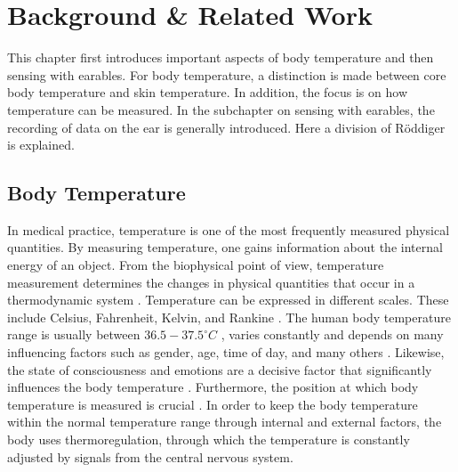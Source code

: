 \chapter{Background \& Related Work}
\label{ch:Background}
This chapter first introduces important aspects of body temperature and then sensing with earables.
For body temperature, a distinction is made between core body temperature and skin temperature. 
In addition, the focus is on how temperature can be measured. 
In the subchapter on sensing with earables, the recording of data on the ear is generally introduced. 
Here a division of Röddiger \cite{roddigerSensingEarablesSystematic2022a} is explained.

\section{Body Temperature}
\label{Background:BodyTemperature}
In medical practice, temperature is one of the most frequently measured physical quantities.
By measuring temperature, one gains information about the internal energy of an object.
From the biophysical point of view, temperature measurement determines the changes in physical quantities that occur in a thermodynamic system \cite{dolibogComparativeAnalysisHuman2022}.
Temperature can be expressed in different scales.
These include Celsius, Fahrenheit, Kelvin, and Rankine \cite{grodzinskyUnderstandingFeverBody2020}.
The human body temperature range is usually between $36.5-37.5^\circ C$ \cite{hutchisonHypothermiaTherapyTraumatic2008}, varies constantly and depends on many influencing factors such as gender, age, time of day, and many others \cite{sund-levanderNormalOralRectal2002}.
Likewise, the state of consciousness and emotions are a decisive factor that significantly influences the body temperature \cite{barbosaescobarTemperatureEmotions2021}.
Furthermore, the position at which body temperature is measured is crucial \cite{Physiologie9783137960072ZVAB}.
In order to keep the body temperature within the normal temperature range through internal and external factors, the body uses thermoregulation, through which the temperature is constantly adjusted by signals from the central nervous system.

